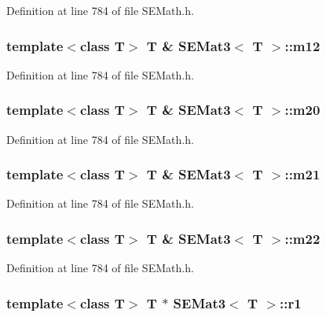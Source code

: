 Definition at line 784 of file S\+E\+Math.\+h.

\subsubsection[{m12}]{\setlength{\rightskip}{0pt plus 5cm}template$<$class T$>$ T \& {\bf S\+E\+Mat3}$<$ T $>$\+::m12}\label{class_s_e_mat3_acbcfb6e63be28a1e143fc58e91df6644}


Definition at line 784 of file S\+E\+Math.\+h.

\subsubsection[{m20}]{\setlength{\rightskip}{0pt plus 5cm}template$<$class T$>$ T \& {\bf S\+E\+Mat3}$<$ T $>$\+::m20}\label{class_s_e_mat3_adfc42ca3baab784970eaec2df3b1cb26}


Definition at line 784 of file S\+E\+Math.\+h.

\subsubsection[{m21}]{\setlength{\rightskip}{0pt plus 5cm}template$<$class T$>$ T \& {\bf S\+E\+Mat3}$<$ T $>$\+::m21}\label{class_s_e_mat3_a115a55f2f63e949d389da2873d0df24b}


Definition at line 784 of file S\+E\+Math.\+h.

\subsubsection[{m22}]{\setlength{\rightskip}{0pt plus 5cm}template$<$class T$>$ T \& {\bf S\+E\+Mat3}$<$ T $>$\+::m22}\label{class_s_e_mat3_a69c0cfe02caca22ffa7f3663e4cf0022}


Definition at line 784 of file S\+E\+Math.\+h.

\subsubsection[{r1}]{\setlength{\rightskip}{0pt plus 5cm}template$<$class T$>$ T $\ast$ {\bf S\+E\+Mat3}$<$ T $>$\+::r1}\label{class_s_e_mat3_ad9e31557f0ef8dc1e13fe9dc5a1de2a2}


